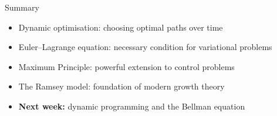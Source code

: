 \documentclass[aspectratio=169, 10pt]{beamer}
\begin{document}
\begin{frame}{Summary}
\begin{itemize}\item Dynamic optimisation: choosing optimal paths over time\item Euler--Lagrange equation: necessary condition for variational problems\item Maximum Principle: powerful extension to control problems\item The Ramsey model: foundation of modern growth theory\item \textbf{Next week:} dynamic programming and the Bellman equation\end{itemize}
\end{frame}
\end{document}
